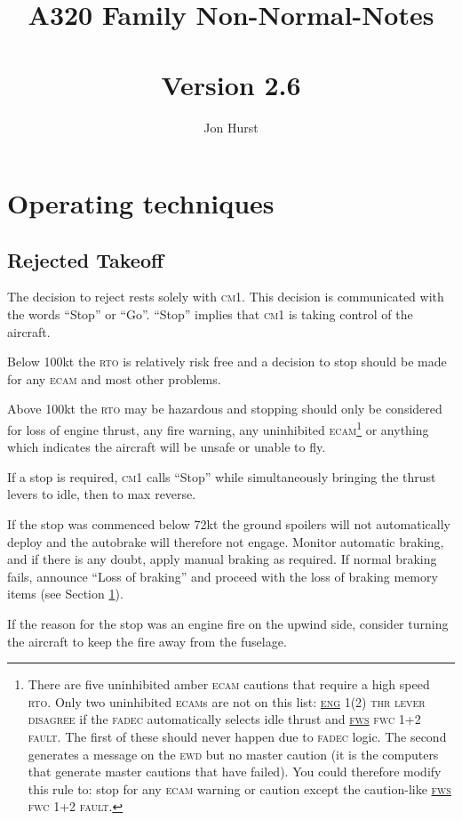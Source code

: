 \documentclass[a5paper,11pt,twoside]{book}
\title{A320 Family Non-Normal-Notes\\~\\\large{Version 2.6}}
\author{Jon Hurst}
\date{}
\newcommand{\ac}[1]{{\scshape\MakeLowercase{#1}}}
\newcommand{\ecam}[2]{{\ac{\uline{#1} #2}}}
\begin{document}
\frontmatter
\maketitle
\tableofcontents

\mainmatter
\chapter{Operating techniques}
\label{sec-loss-of-braking}
\section{Rejected Takeoff}
The decision to reject rests solely with \ac{CM}1. This decision is communicated
with the words ``Stop'' or “Go''. ``Stop'' implies that \ac{CM}1 is taking
control of the aircraft.

Below 100kt the \ac{RTO} is relatively risk free and a decision to stop should
be made for any \ac{ECAM} and most other problems.

Above 100kt the \ac{RTO} may be hazardous and stopping should only be considered
for loss of engine thrust, any fire warning, any uninhibited
\ac{ECAM}\footnote{There are five uninhibited amber \ac{ECAM} cautions that
require a high speed \ac{RTO}. Only two uninhibited \ac{ECAM}s are not on this
list: \ecam{ENG}{1(2) THR LEVER DISAGREE} if the \ac{FADEC} automatically
selects idle thrust and \ecam{FWS}{FWC 1+2 FAULT}. The first of these should
never happen due to \ac{FADEC} logic. The second generates a message on the
\ac{EWD} but no master caution (it is the computers that generate master
cautions that have failed). You could therefore modify this rule to: stop for
any \ac{ECAM} warning or caution except the caution-like \ecam{FWS}{FWC 1+2
  FAULT}.} or anything which indicates the aircraft will be unsafe or unable to
fly.

If a stop is required, \ac{CM}1 calls ``Stop'' while simultaneously bringing the
thrust levers to idle, then to max reverse.

If the stop was commenced below 72kt the ground spoilers will not automatically
deploy and the autobrake will therefore not engage. Monitor automatic braking,
and if there is any doubt, apply manual braking as required. If normal braking
fails, announce ``Loss of braking'' and proceed with the loss of braking memory
items (see Section \ref{sec-loss-of-braking}).

If the reason for the stop was an engine fire on the upwind side, consider
turning the aircraft to keep the fire away from the fuselage.
\end{document}
